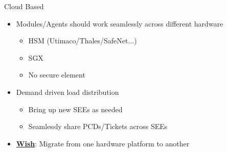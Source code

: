 \documentclass[handout,xcolor=svgnames]{beamer}
\newcommand{\hicolor}{darkorange}
\newcommand{\imp}[1]{\begin{center}\Large{\color{\hicolor}{#1}}\end{center}}
\newcommand{\pointout}[1]{{\underline{\textbf{#1}}}}
\begin{document}
\begin{frame}
  {Cloud Based}
  \imp{SEE should run across heterogeneous set of hardware platform/secure element}
  \begin{itemize}
      \item Modules/Agents should work seamlessly across different hardware
      \begin{itemize}
          \item HSM (Utimaco/Thales/SafeNet...)
          \item SGX
          \item No secure element
      \end{itemize}
      \item Demand driven load distribution
      \begin{itemize}
          \item Bring up new SEEs as needed
          \item Seamlessly share PCDs/Tickets across SEEs
      \end{itemize}
      \item \pointout{Wish}: Migrate from one hardware platform to another
  \end{itemize}
\end{frame}
\end{document}
